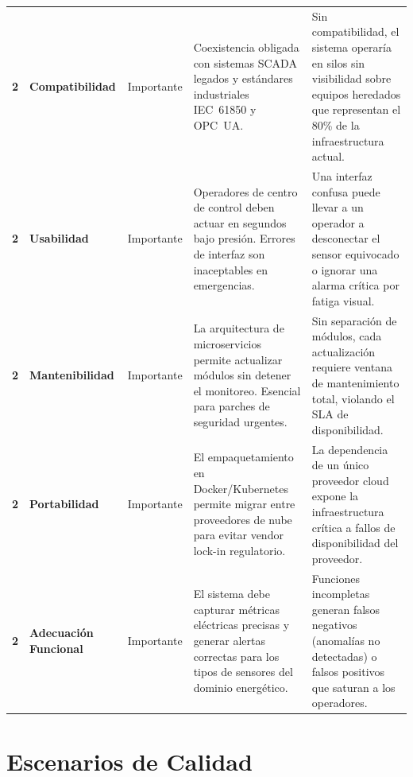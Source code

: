 \documentclass[12pt, letterpaper]{article}
\begin{document}
\begin{longtable}{
  C{1.2cm}
  P{2.8cm}
  C{1.8cm}
  P{3.8cm}
  P{4.1cm}
}
\textbf{2} & \textbf{Compatibilidad} &
  Importante &
  Coexistencia obligada con sistemas SCADA legados y estándares industriales
  IEC~61850 y OPC~UA. &
  Sin compatibilidad, el sistema operaría en silos sin visibilidad sobre equipos
  heredados que representan el 80\% de la infraestructura actual. \\

\textbf{2} & \textbf{Usabilidad} &
  Importante &
  Operadores de centro de control deben actuar en segundos bajo presión. Errores de
  interfaz son inaceptables en emergencias. &
  Una interfaz confusa puede llevar a un operador a desconectar el sensor equivocado o
  ignorar una alarma crítica por fatiga visual. \\

\textbf{2} & \textbf{Mantenibilidad} &
  Importante &
  La arquitectura de microservicios permite actualizar módulos sin detener el
  monitoreo. Esencial para parches de seguridad urgentes. &
  Sin separación de módulos, cada actualización requiere ventana de mantenimiento
  total, violando el SLA de disponibilidad. \\

\textbf{2} & \textbf{Portabilidad} &
  Importante &
  El empaquetamiento en Docker/Kubernetes permite migrar entre proveedores de nube
  para evitar vendor lock-in regulatorio. &
  La dependencia de un único proveedor cloud expone la infraestructura crítica a
  fallos de disponibilidad del proveedor. \\

\textbf{2} & \textbf{Adecuación Funcional} &
  Importante &
  El sistema debe capturar métricas eléctricas precisas y generar alertas correctas
  para los tipos de sensores del dominio energético. &
  Funciones incompletas generan falsos negativos (anomalías no detectadas) o falsos
  positivos que saturan a los operadores. \\

\end{longtable}
\section{Escenarios de Calidad}
\end{document}
